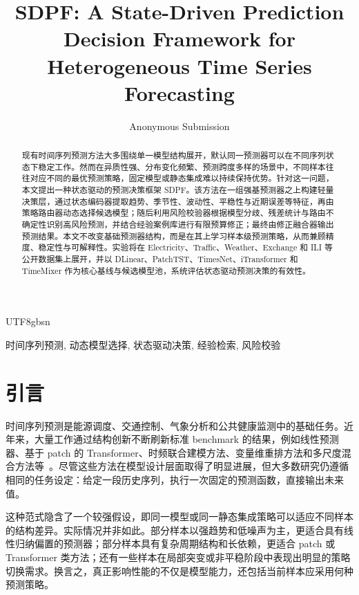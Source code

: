 \documentclass[journal,twoside,web]{ieeecolor}
\begin{document}
\title{SDPF: A State-Driven Prediction Decision Framework for Heterogeneous Time Series Forecasting}
\author{Anonymous Submission}

\maketitle
\begin{CJK*}{UTF8}{gbsn}

\begin{abstract}
现有时间序列预测方法大多围绕单一模型结构展开，默认同一预测器可以在不同序列状态下稳定工作。然而在异质性强、分布变化频繁、预测跨度多样的场景中，不同样本往往对应不同的最优预测策略，固定模型或静态集成难以持续保持优势。针对这一问题，本文提出一种状态驱动的预测决策框架 SDPF。该方法在一组强基预测器之上构建轻量决策层，通过状态编码器提取趋势、季节性、波动性、平稳性与近期误差等特征，再由策略路由器动态选择候选模型；随后利用风险校验器根据模型分歧、残差统计与路由不确定性识别高风险预测，并结合经验案例库进行有限预算修正；最终由修正融合器输出预测结果。本文不改变基础预测器结构，而是在其上学习样本级预测策略，从而兼顾精度、稳定性与可解释性。实验将在 Electricity、Traffic、Weather、Exchange 和 ILI 等公开数据集上展开，并以 DLinear、PatchTST、TimesNet、iTransformer 和 TimeMixer 作为核心基线与候选模型池，系统评估状态驱动预测决策的有效性。
\end{abstract}

\begin{IEEEkeywords}
时间序列预测, 动态模型选择, 状态驱动决策, 经验检索, 风险校验
\end{IEEEkeywords}

\section{引言}
时间序列预测是能源调度、交通控制、气象分析和公共健康监测中的基础任务。近年来，大量工作通过结构创新不断刷新标准 benchmark 的结果，例如线性预测器、基于 patch 的 Transformer、时频联合建模方法、变量维重排方法和多尺度混合方法等~\cite{dlinear,patchtst,timesnet,itransformer,timemixer}。尽管这些方法在模型设计层面取得了明显进展，但大多数研究仍遵循相同的任务设定：给定一段历史序列，执行一次固定的预测函数，直接输出未来值。

这种范式隐含了一个较强假设，即同一模型或同一静态集成策略可以适应不同样本的结构差异。实际情况并非如此。部分样本以强趋势和低噪声为主，更适合具有线性归纳偏置的预测器；部分样本具有复杂周期结构和长依赖，更适合 patch 或 Transformer 类方法；还有一些样本在局部突变或非平稳阶段中表现出明显的策略切换需求。换言之，真正影响性能的不仅是模型能力，还包括当前样本应采用何种预测策略。


\end{CJK*}
\end{document}
